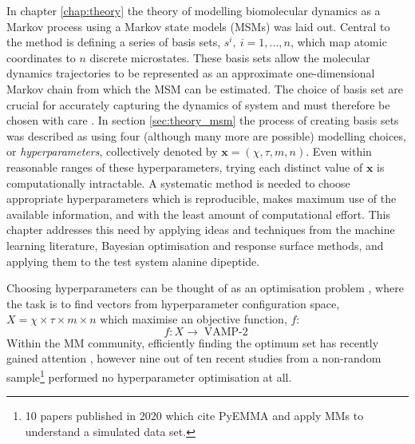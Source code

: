 In chapter \ref{chap:theory} the theory of modelling biomolecular dynamics as a Markov process using a Markov state models (MSMs) was laid out. Central to the method is defining  a series of basis sets, $s^i,\ i=1, ..., n$, which  map atomic coordinates to $n$ discrete microstates. These basis sets allow the molecular dynamics trajectories to be represented as an approximate one-dimensional Markov chain from which the MSM can be estimated. The choice of basis set are crucial for accurately capturing the dynamics of system and must therefore be chosen with care \cite{husicOptimizedParameterSelection2016}. In section \ref{sec:theory_msm} the process of creating basis sets was described as using four (although many more are possible) modelling choices, or  \emph{hyperparameters}, collectively denoted by $\mathbf{x} = (\chi, \tau, m, n)$. Even within reasonable ranges of these hyperparameters, trying each distinct value of $\mathbf{x}$ is computationally intractable. A systematic method is needed to choose appropriate hyperparameters which is reproducible, makes maximum use of the available information, and with the least amount of computational effort. This chapter addresses this need by applying ideas and techniques from the machine learning literature, Bayesian optimisation and response surface methods, and applying them to the test system alanine dipeptide. 

Choosing hyperparameters can be thought of as an optimisation problem \cite{feurer2019hyperparameter,jonesEfficientGlobalOptimization1998}, where the task is to find  vectors from hyperparameter configuration space, $X=\chi \times \tau \times m \times n$  which maximise an objective function, $f$:  
\begin{equation}
    f: X \rightarrow \operatorname{VAMP-2}
\end{equation}
Within the MM community, efficiently finding the optimum set has recently gained attention \cite{schererVariationalSelectionFeatures2019}, however nine out of ten recent studies from a non-random sample\footnote{10 papers published in 2020 which cite PyEMMA \cite{schererPyEMMASoftwarePackage2015a} and apply MMs to understand a simulated data set.} performed no hyperparameter optimisation at all.  

